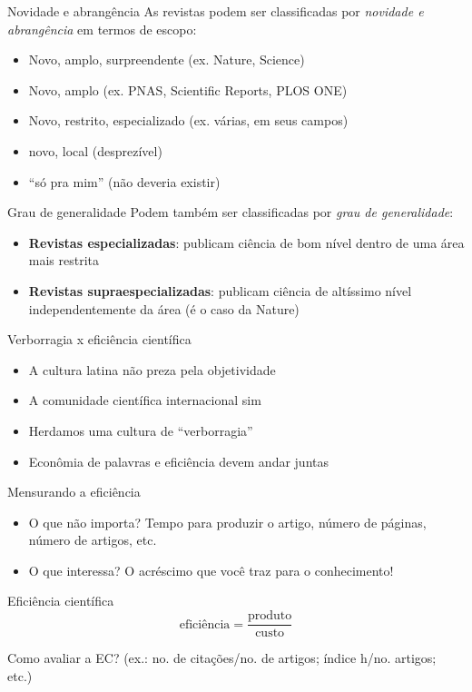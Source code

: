 \begin{frame}{Novidade e abrangência}
As revistas podem ser classificadas por \emph{novidade e abrangência} em termos de escopo: 
\begin{itemize}
\item Novo, amplo, surpreendente (ex. Nature, Science)
\item Novo, amplo (ex. PNAS, Scientific Reports, PLOS ONE)
\item Novo, restrito, especializado (ex. várias, em seus campos)
\item novo, local (desprezível)
\item ``só pra mim'' (não deveria existir)
\end{itemize}
\end{frame}

\begin{frame}{Grau de generalidade}
Podem também ser classificadas por \emph{grau de generalidade}:
\begin{itemize}
\item \textbf{Revistas especializadas}: publicam ciência de bom nível dentro de uma área mais restrita
\item \textbf{Revistas supraespecializadas}: publicam ciência de altíssimo nível independentemente da área (é o caso da Nature)
\end{itemize}
\end{frame}

\begin{frame}{Verborragia x eficiência científica}
\begin{itemize}
\item A cultura latina não preza pela objetividade 
\item A comunidade científica internacional sim 
\item Herdamos uma cultura de ``verborragia''
\item Econômia de palavras e eficiência devem andar juntas
\end{itemize}
\end{frame}

\begin{frame}{Mensurando a eficiência}
\begin{itemize}
\item O que não importa? Tempo para produzir o artigo, número de páginas, número de artigos, etc.
\item O que interessa? O acréscimo que você traz para o conhecimento!
\end{itemize}
\begin{block}{Eficiência científica}
\[
\textrm{eficiência} = \dfrac{\textrm{produto}}{\textrm{custo}}
\]
\end{block}

Como avaliar a EC? (ex.: no. de citações/no. de artigos; índice h/no. artigos; etc.)
\end{frame}


